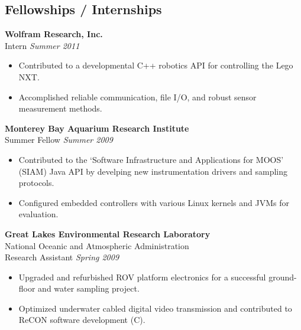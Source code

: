 \documentclass{article}
\begin{document}
{\begin{multicols}{2}
\section*{Fellowships / Internships}
\noindent
    \textbf{Wolfram Research, Inc. }\\
     Intern \hfill \textsl{Summer 2011} \\
    \vspace{ -10px}
    \begin{itemize}[noitemsep,nolistsep]
        \item Contributed to a developmental C++ robotics API for controlling the Lego NXT. 
	 \item Accomplished reliable communication, file I/O, and robust sensor measurement methods. 
    \end{itemize}
    \vspace{5px}
    \textbf{Monterey Bay Aquarium Research Institute}\\
     Summer Fellow \hfill \textsl{Summer 2009}  \\
    \vspace{ -10px}	
    \begin{itemize}[noitemsep,nolistsep]
	\item Contributed to the `Software Infrastructure and Applications for MOOS' (SIAM) Java API by develping new instrumentation drivers and sampling protocols.
	\item Configured embedded controllers with various Linux kernels and JVMs for evaluation.
    \end{itemize}
    \vspace{5px}
    \textbf{Great Lakes Environmental Research Laboratory}\\
    National Oceanic and Atmospheric Administration\\
    Research Assistant \hfill \textsl{Spring 2009} \\
    \vspace{ -10px}
    \begin{itemize}[noitemsep,nolistsep]
	\item Upgraded and refurbished ROV platform electronics for a successful ground-floor and water sampling project.
	\item Optimized underwater cabled digital video transmission and contributed to ReCON software development (C).

\end{itemize}
\end{multicols}}
\end{document}
